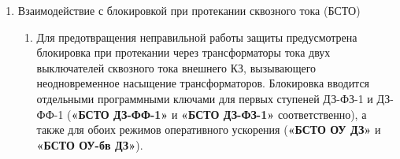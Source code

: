 \begin{enumerate}[label=\arabic{section}.\arabic{subsection}.\arabic{enumi}, labelsep=4pt, leftmargin=0pt, itemindent=57pt, itemsep=0pt, parsep=5pt]
\begin{enumerate}[label=\arabic{section}.\arabic{subsection}.\arabic{enumi}.\arabic*, labelsep=4pt, leftmargin=0em, itemindent=65pt, parsep=0pt]
\end{enumerate}


\item\label{sec:secbsto} Взаимодействие с блокировкой при протекании сквозного тока (БСТО)
\begin{enumerate}[label=\arabic{section}.\arabic{subsection}.\arabic{enumi}.\arabic*, labelsep=4pt, leftmargin=0em, itemindent=65pt, parsep=0pt]

\item
Для предотвращения неправильной работы защиты предусмотрена блокировка при протекании через трансформаторы тока двух выключателей сквозного тока внешнего КЗ, вызывающего неодновременное насыщение трансформаторов. Блокировка вводится отдельными программными ключами для первых ступеней ДЗ-ФЗ-1 и ДЗ-ФФ-1 (\textbf{«БСТО ДЗ-ФФ-1»} и \textbf{«БСТО ДЗ-ФЗ-1»} соответственно), а также для обоих режимов оперативного ускорения (\textbf{«БСТО ОУ ДЗ»} и \textbf{«БСТО ОУ-бв ДЗ»}).

\end{enumerate}


\end{enumerate}
